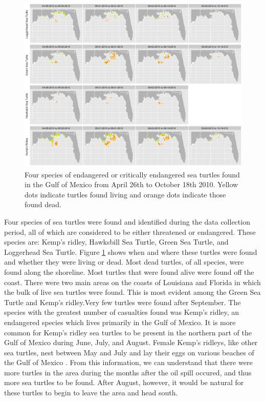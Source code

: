 \documentclass[authoryear,12pt]{elsarticle}
\begin{document}
\begin{figure}[htbp] %
   \centering
   \includegraphics[width=6in]{turtles.png} 
   \caption{Four species of endangered or critically endangered sea turtles found in the Gulf of Mexico from April 26th to October 18th 2010.  Yellow dots indicate turtles found living and orange dots indicate those found dead.}
   \label{turtles}
\end{figure}

Four species of sea turtles were found and identified during the data collection period, all of which are considered to be either threatened or endangered. These species are: Kemp's ridley, Hawksbill Sea Turtle, Green Sea Turtle, and Loggerhead Sea Turtle. Figure \ref{turtles} shows when and where these turtles were found and whether they were living or dead. Most dead turtles, of all species, were found along the shoreline. Most turtles that were found alive were found off the coast. There were two main areas on the coasts of Louisiana and Florida in which the bulk of live sea turtles were found.  This is most evident among the Green Sea Turtle and Kemp's ridley.Very few turtles were found after September. The species with the greatest number of casualties found was Kemp's ridley, an endangered species which lives primarily in the Gulf of Mexico.  It is more common for Kemp's ridley sea turtles to be present in the northern part of the Gulf of Mexico during June, July, and August. Female Kemp's ridleys, like other sea turtles, nest between May and July and lay their eggs on various beaches of the Gulf of Mexico  \citet{turtles}. From this information, we can understand that there were more turtles in the area during the months after the oil spill occured, and thus more sea turtles to be found.  After August, however, it would be natural for these turtles to begin to leave the area and head south.
\end{document}
